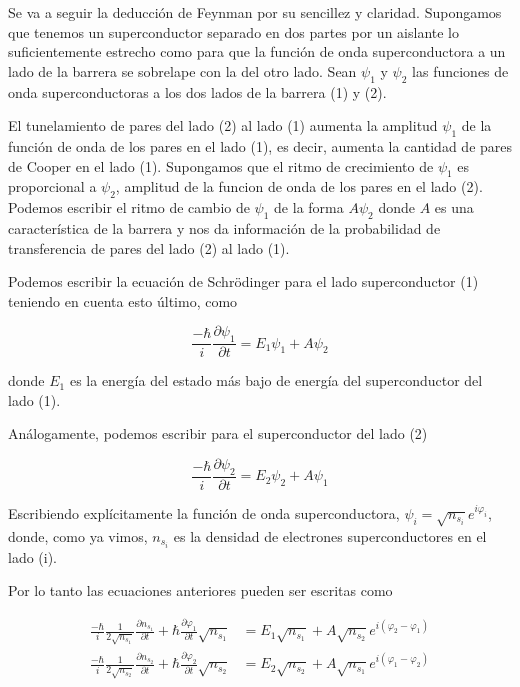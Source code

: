 Se va a seguir la deducción de Feynman por su sencillez y claridad. Supongamos que tenemos un superconductor separado en dos partes por un aislante lo suficientemente estrecho como para que la función de onda superconductora a un lado de la barrera se sobrelape con la del otro lado. Sean $\psi_1$ y $\psi_2$ las funciones de onda superconductoras a los dos lados de la barrera (1) y (2).

El tunelamiento de pares del lado (2) al lado (1) aumenta la amplitud $\psi_1$ de la función de onda de los pares en el lado (1), es decir, aumenta la cantidad de pares de Cooper en el lado (1). Supongamos que el ritmo de crecimiento de $\psi_1$ es proporcional a $\psi_2$, amplitud de la funcion de onda de los pares en el lado (2). Podemos escribir el ritmo de cambio de $\psi_1$ de la forma $A \psi_2$ donde $A$ es una característica de la barrera y nos da información de la probabilidad de transferencia de pares del lado (2) al lado (1).

Podemos escribir la ecuación de Schrödinger para el lado superconductor (1) teniendo en cuenta esto último, como

\begin{equation}
    \frac{-\hbar}{i} \frac{\partial \psi_1}{\partial t} = E_1 \psi_1 + A \psi_2
\end{equation}

donde $E_1$ es la energía del estado más bajo de energía del superconductor del lado (1).

Análogamente, podemos escribir para el superconductor del lado (2)

\begin{equation}
    \frac{-\hbar}{i} \frac{\partial \psi_2}{\partial t} = E_2 \psi_2 + A \psi_1
\end{equation}

Escribiendo explícitamente la función de onda superconductora, $\psi_i = \sqrt{n_{s_i}} e^{i \varphi_i}$, donde, como ya vimos, $n_{s_i}$ es la densidad de electrones superconductores en el lado (i).

Por lo tanto las ecuaciones anteriores pueden ser escritas como

\begin{align}
    \frac{-\hbar}{i} \frac{1}{2 \sqrt{n_{s_1}}} \frac{\partial n_{s_1}}{\partial t} + \hbar \frac{\partial \varphi_1}{\partial t} \sqrt{n_{s_1}} &= E_1 \sqrt{n_{s_1}} + A \sqrt{n_{s_2}} e^{i (\varphi_2 - \varphi_1)} \\
    \frac{-\hbar}{i} \frac{1}{2 \sqrt{n_{s_2}}} \frac{\partial n_{s_2}}{\partial t} + \hbar \frac{\partial \varphi_2}{\partial t} \sqrt{n_{s_2}} &= E_2 \sqrt{n_{s_2}} + A \sqrt{n_{s_1}} e^{i (\varphi_1 - \varphi_2)}
\end{align}


